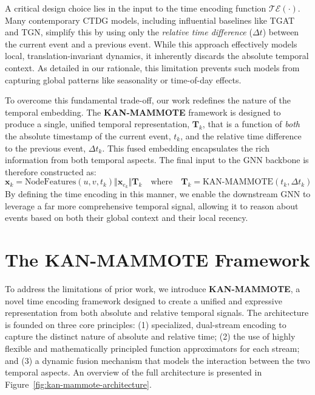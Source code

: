 \documentclass{article}
\begin{document}
A critical design choice lies in the input to the time encoding function $\mathcal{TE}(\cdot)$. Many contemporary CTDG models, including influential baselines like TGAT and TGN, simplify this by using only the \textit{relative time difference} ($\Delta t$) between the current event and a previous event. While this approach effectively models local, translation-invariant dynamics, it inherently discards the absolute temporal context. As detailed in our rationale, this limitation prevents such models from capturing global patterns like seasonality or time-of-day effects.

To overcome this fundamental trade-off, our work redefines the nature of the temporal embedding. The \textbf{KAN-MAMMOTE} framework is designed to produce a single, unified temporal representation, $\mathbf{T}_k$, that is a function of \textit{both} the absolute timestamp of the current event, $t_k$, and the relative time difference to the previous event, $\Delta t_k$. This fused embedding encapsulates the rich information from both temporal aspects. The final input to the GNN backbone is therefore constructed as:
\begin{equation}
\mathbf{x}_k = \text{NodeFeatures}(u, v, t_k) \Vert \mathbf{x}_{e_k} \Vert \mathbf{T}_k \quad \text{where} \quad \mathbf{T}_k = \text{KAN-MAMMOTE}(t_k, \Delta t_k)
\end{equation}
By defining the time encoding in this manner, we enable the downstream GNN to leverage a far more comprehensive temporal signal, allowing it to reason about events based on both their global context and their local recency.
\section{The KAN-MAMMOTE Framework}

To address the limitations of prior work, we introduce \textbf{KAN-MAMMOTE}, a novel time encoding framework designed to create a unified and expressive representation from both absolute and relative temporal signals. The architecture is founded on three core principles: (1) specialized, dual-stream encoding to capture the distinct nature of absolute and relative time; (2) the use of highly flexible and mathematically principled function approximators for each stream; and (3) a dynamic fusion mechanism that models the interaction between the two temporal aspects. An overview of the full architecture is presented in Figure~\ref{fig:kan-mammote-architecture}. %
\end{document}
